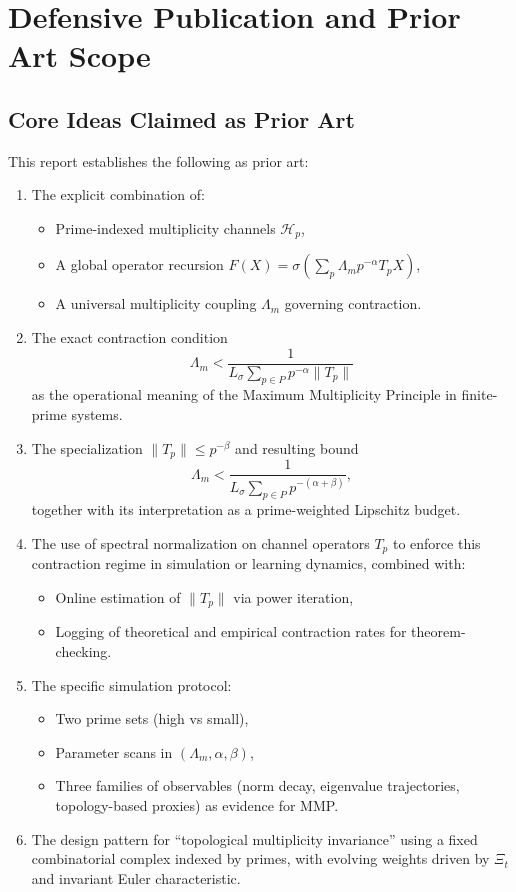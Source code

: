 \documentclass[12pt]{article}
\begin{document}
\newpage

\section{Defensive Publication and Prior Art Scope}

\subsection{Core Ideas Claimed as Prior Art}

This report establishes the following as prior art:

\begin{enumerate}
  \item The explicit combination of:
        \begin{itemize}
          \item Prime-indexed multiplicity channels \(\mathcal{H}_p\),
          \item A global operator recursion \(F(X)=\sigma(\sum_p \Lambda_m p^{-\alpha} T_pX)\),
          \item A universal multiplicity coupling \(\Lambda_m\) governing contraction.
        \end{itemize}
  \item The exact contraction condition
        \[
          \Lambda_m < \frac{1}{L_\sigma \sum_{p\in P} p^{-\alpha}\|T_p\|}
        \]
        as the operational meaning of the Maximum Multiplicity Principle in finite-prime systems.
  \item The specialization \(\|T_p\|\le p^{-\beta}\) and resulting bound
        \[
          \Lambda_m < \frac{1}{L_\sigma \sum_{p\in P} p^{-(\alpha+\beta)}},
        \]
        together with its interpretation as a prime-weighted Lipschitz budget.
  \item The use of spectral normalization on channel operators \(T_p\) to enforce this contraction regime in simulation or learning dynamics, combined with:
        \begin{itemize}
          \item Online estimation of \(\|T_p\|\) via power iteration,
          \item Logging of theoretical and empirical contraction rates for theorem-checking.
        \end{itemize}
  \item The specific simulation protocol:
        \begin{itemize}
          \item Two prime sets (high vs small),
          \item Parameter scans in \((\Lambda_m,\alpha,\beta)\),
          \item Three families of observables (norm decay, eigenvalue trajectories, topology-based proxies) as evidence for MMP.
        \end{itemize}
  \item The design pattern for ``topological multiplicity invariance'' using a fixed combinatorial complex indexed by primes, with evolving weights driven by \(\Xi_t\) and invariant Euler characteristic.
\end{enumerate}
\end{document}
